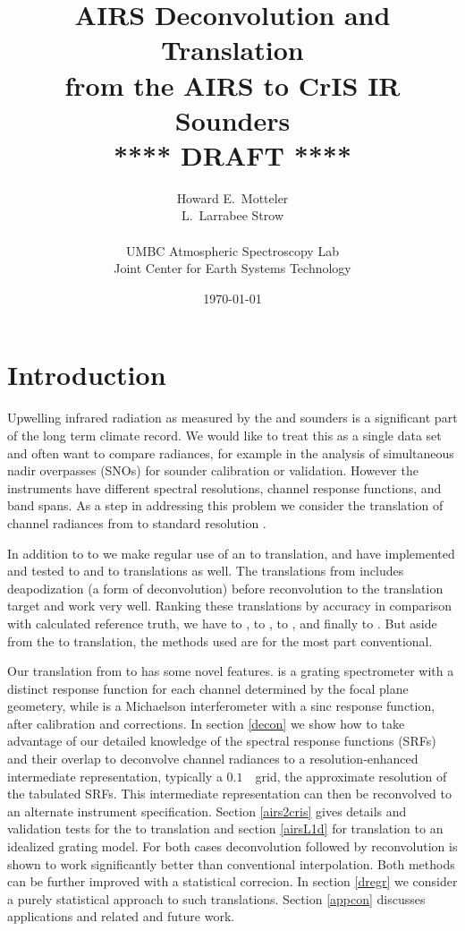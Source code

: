 \documentclass[11pt]{article}
\title{AIRS Deconvolution and Translation \\
  from the AIRS to CrIS IR Sounders \\
  \vspace{3mm}
  {****} DRAFT {****}\\
}
\author{Howard E.~Motteler \\
  L.~Larrabee Strow \\
  \\
  UMBC Atmospheric Spectroscopy Lab \\
  Joint Center for Earth Systems Technology \\
}
\date{\today}
\begin{document}
\maketitle

\section{Introduction}

Upwelling infrared radiation as measured by the {\airs} \cite{airs1}
and {\cris} \cite{cris1,cris2} sounders is a significant part of the
long term climate record.  We would like to treat this as a single
data set and often want to compare radiances, for example in the
analysis of simultaneous nadir overpasses (SNOs) for sounder
calibration or validation.  However the instruments have different
spectral resolutions, channel response functions, and band spans.
As a step in addressing this problem we consider the translation of
channel radiances from {\airs} to standard resolution {\cris}.

In addition to {\airs} to {\cris} we make regular use of an {\iasi}
to {\cris} translation, and have implemented and tested {\iasi} to
{\airs} and {\cris} to {\airs} translations as well.  The
translations from {\iasi} includes deapodization (a form of
deconvolution) before reconvolution to the translation target and
work very well.  Ranking these translations by accuracy in
comparison with calculated reference truth, we have {\iasi} to
{\cris}, {\iasi} to {\airs}, {\airs} to {\cris}, and finally {\cris}
to {\airs} \cite{deconATBD}.  But aside from the {\airs} to {\cris}
translation, the methods used are for the most part conventional.

Our translation from {\airs} to {\cris} has some novel features.
{\airs} is a grating spectrometer with a distinct response function
for each channel determined by the focal plane geometery, while
{\cris} is a Michaelson interferometer with a sinc response
function, after calibration and corrections.  In section \ref{decon}
we show how to take advantage of our detailed knowledge of the
{\airs} spectral response functions (SRFs) and their overlap to
deconvolve channel radiances to a resolution-enhanced intermediate
representation, typically a $0.1$~\wn\ grid, the approximate
resolution of the tabulated {\airs} SRFs.  
This intermediate representation can then be reconvolved to an
alternate instrument specification.  Section \ref{airs2cris} gives
details and validation tests for the {\airs} to {\cris} translation
and section \ref{airsL1d} for translation to an idealized grating
model.  For both cases deconvolution followed by reconvolution is
shown to work significantly better than conventional interpolation.
Both methods can be further improved with a statistical correcion.
In section \ref{dregr} we consider a purely statistical approach to
such translations.  Section \ref{appcon} discusses applications and
related and future work.
\end{document}
